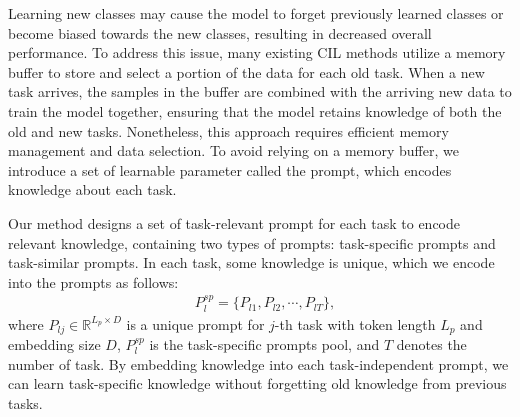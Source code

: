 \documentclass[sigconf,anonymous,review,screen]{acmart}
\begin{document}

Learning new classes may cause the model to forget previously learned classes or become biased towards the new classes, resulting in decreased overall performance. To address this issue, many existing CIL methods \cite{rebuffi2017icarl,aljundi2019gradient} utilize a memory buffer to store and select a portion of the data for each old task. When a new task arrives, the samples in the buffer are combined with the arriving new data to train the model together, ensuring that the model retains knowledge of both the old and new tasks. Nonetheless, this approach requires efficient memory management and data selection. To avoid relying on a memory buffer, we introduce a set of learnable parameter called the prompt, which encodes knowledge about each task. 

Our method designs a set of task-relevant prompt for each task to encode relevant knowledge, containing two types of prompts: task-specific prompts and task-similar prompts. In each task, some knowledge is unique, which we encode into the prompts as follows:
\begin{equation}\label{eqn-1}
	\begin{aligned}
		&P^{sp}_l = \{ P_{l1}, P_{l2}, \cdots, P_{lT} \},
	\end{aligned}
\end{equation}
where $P_{lj} \in \mathbb{R}^{L_p \times D}$ is a unique prompt for $j$-th task with token length $L_p$ and embedding size $D$, $P^{sp}_l$ is the task-specific prompts pool, and $T$ denotes the number of task. By embedding knowledge into each task-independent prompt, we can learn task-specific knowledge without forgetting old knowledge from previous tasks.
\end{document}

